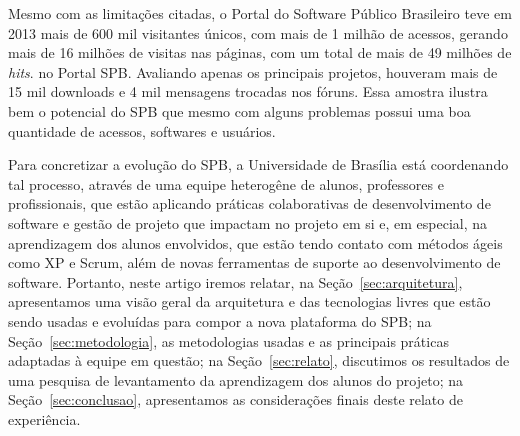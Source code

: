 Mesmo com as limitações citadas, o Portal do Software Público Brasileiro teve
em 2013 mais de 600 mil visitantes únicos, com mais de 1 milhão de acessos,
gerando mais de 16 milhões de visitas nas páginas, com um total de mais de 49
milhões de \emph{hits}. no Portal SPB.
%
Avaliando apenas os principais projetos, houveram mais de 15 mil downloads e
4 mil mensagens trocadas nos fóruns.
%
Essa amostra ilustra bem o potencial do SPB que mesmo com alguns problemas
possui uma boa quantidade de acessos, softwares e usuários.


Para concretizar a evolução do SPB, a Universidade de Brasília está coordenando
tal processo, através de uma equipe heterogêne de alunos, professores e
profissionais, que estão aplicando práticas colaborativas de desenvolvimento
de software e gestão de projeto que impactam no projeto em si e, em especial,
na aprendizagem dos alunos envolvidos, que estão tendo contato com métodos ágeis como 
XP e Scrum, além de novas ferramentas de suporte ao desenvolvimento de software. 
%
Portanto, neste artigo iremos relatar,
%
na Seção~\ref{sec:arquitetura}, apresentamos uma visão geral da arquitetura e
das tecnologias livres que estão sendo usadas e evoluídas para compor a nova
plataforma do SPB;
%
na Seção~\ref{sec:metodologia}, as
metodologias usadas e as principais práticas adaptadas à equipe em questão;
%
na Seção~\ref{sec:relato}, discutimos os resultados de uma pesquisa de
levantamento da aprendizagem dos alunos do projeto;
%
na Seção~\ref{sec:conclusao}, apresentamos as considerações finais deste relato
de experiência. 


